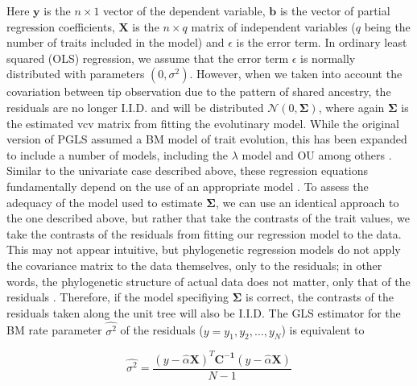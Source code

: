 \documentclass[a4paper,12pt]{article}
\begin{document}
Here $\mathbf{y}$ is the $n \times 1$ vector of the dependent variable, $\mathbf{b}$ is the vector of partial regression coefficients, $\mathbf{X}$ is the $n \times q$ matrix of independent variables ($q$ being the number of traits included in the model) and $\epsilon$ is the error term. In ordinary least squared (OLS) regression, we assume that the error term $\epsilon$ is normally distributed with parameters $(0, \sigma^2)$. However, when we taken into account the covariation between tip observation due to the pattern of shared ancestry, the residuals are no longer I.I.D. and will be distributed $\mathcal{N} (0, \mathbf{\Sigma})$, where again $\mathbf{\Sigma}$ is the estimated vcv matrix from fitting the evolutinary model. While the original version of PGLS assumed a BM model of trait evolution, this has been expanded to include a number of models, including the $\lambda$ model \citep{Pagel1997, Revell2010, Freckleton2011} and OU \citep[e.g.][]{Hansen2008} among others \citep[see also][]{Lynch1991, Hadfield2010}. Similar to the univariate case described above, these regression equations fundamentally depend on the use of an appropriate model \citep{Hansen2012}. To assess the adequacy of the model used to estimate $\mathbf{\Sigma}$, we can use an identical approach to the one described above, but rather that take the contrasts of the trait values, we take the contrasts of the residuals from fitting our regression model to the data. This may not appear intuitive, but phylogenetic regression models do not apply the covariance matrix to the data themselves, only to the residuals; in other words, the phylogenetic structure of actual data does not matter, only that of the residuals \citep{Rohlf2001}. Therefore, if the model specifiying $\mathbf{\Sigma}$ is correct, the contrasts of the residuals taken along the unit tree will also be I.I.D. The GLS estimator for the  BM rate parameter $\hat{\sigma^2}$ of the residuals ($y = y_1, y_2, \ldots , y_N$) is equivalent to

\begin{equation}
\hat{\sigma^2} = \frac{(y - \hat{\alpha}\mathbf{X})^T \mathbf{C^{-1}} (y - \hat{\alpha}\mathbf{X})}{N-1} 
\end{equation}
\end{document}
